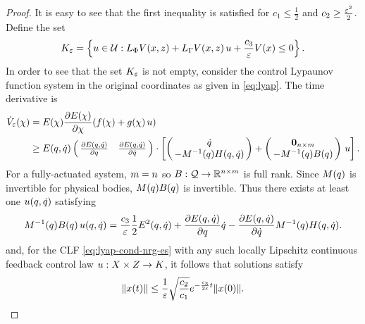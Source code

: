 \begin{proof}
  It is easy to see that the first inequality is satisfied for $c_{1} \leq \frac{1}{2}$ and $c_{2} \geq \frac{\varepsilon^{2}}{2}$.
  Define the set
  \begin{align}
    K_{\varepsilon} = \left\{ u \in \mathcal{U} : L_{\Phi} V(x, z) + L_{\Gamma} V(x, z) \, u + \frac{c_{3}}{\varepsilon} V(x) \leq 0 \right\}.
    \label{eq:control-set}
  \end{align}
  In order to see that the set $K_{\varepsilon}$ is not empty, consider the control Lypaunov function system in the original coordinates as given in \eqref{eq:lyap}.
  The time derivative is
  \begin{align}
    \dVe(\x) &= \E(\x) \pd{\E(\x)}{\x}(f(\x) + g(\x) \, \u)\\
    \nonumber
    &\geq \E(\q, \dq) \left(\!\!\begin{array}{c c}
    \pd{\E(\q, \dq)}{\q} & \pd{\E(\q, \dq)}{\dq}
    \end{array}\!\!\right) \cdot
    \left[
      \left(\!\!\begin{array}{c}
      \dq\\
      -\M^{-1}(\q) \CG(\q, \dq)
      \end{array}\!\!\right) +
      \left(\!\!\begin{array}{c}
      \boldzero_{\ndim \times \ncv}\\
      -\M^{-1}(\q) \B(\q)
      \end{array}\!\!\right) \, \u
      \right].
  \end{align}
  For a fully-actuated system, $m = n$ so $B : \mathcal{Q} \to \mathbb{R}^{n \times m}$ is full rank.
  Since $M(q)$ is invertible for physical bodies, $M(q) B(q)$ is invertible.
  Thus there exists at least one $u(q, \dot{q})$ satisfying
  \begin{align}
    M^{-1}(q) B(q) \, u(q, \dot{q}) = \frac{c_{3}}{\varepsilon} \frac{1}{2} E^{2}(q, \dot{q}) + \frac{\partial{E(q, \dot{q})}}{\partial{q}} \dot{q} - \frac{\partial{E(q, \dot{q})}}{\partial{\dot{q}}} M^{-1}(q) H(q, \dot{q}).
  \end{align}
  and, for the CLF \eqref{eq:lyap-cond-nrg-es} with any such locally Lipschitz continuous feedback control law $u : X \times Z \to K$, it follows that solutions satisfy
  \begin{align}
    \label{eq:xt-bounds}
    \| x(t) \| \leq \frac{1}{\varepsilon} \sqrt{\frac{c_{2}}{c_{1}}} e^{-\frac{c_{3}}{2\varepsilon} t} \| x(0) \|.
  \end{align}
\end{proof}

